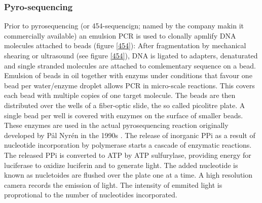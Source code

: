\subsubsection{Pyro-sequencing}
\label{sec:pyro-seq}



Prior to pyrosequencing (or 454-sequencign; named by the company makin
it commercially available) an emulsion PCR is used to clonally apmlify
DNA molecules attached to beads (figure \ref{454}): After
fragmentation by mechanical shearing or ultrasound \cite{pmid20298868}
(see figure \ref{454}), DNA is ligated to adapters, denaturated and
single stranded molecules are attached to comlementary sequence on a
bead. Emulsion of beads in oil together with enzyms under conditions
that favour one bead per water/enzyme droplet allows PCR in
micro-scale reactions. This covers each bead with multiple copies of
one target molecule. The beads are then distributed over the wells of
a fiber-optic slide, the so called picolitre plate. A single bead per
well is covered with enzymes on the surface of smaller beads. These
enzymes are used in the actual pyrosequencing reaction originally
developed by P\r{a}l Nyr\'{e}n in the 1990s \cite{pmid17185753}. The
release of inorganic PPi as a result of nucleotide incorporation by
polymerase starts a cascade of enzymatic reactions. The released PPi
is converted to ATP by ATP sulfurylase, providing energy for
luciferase to oxidize luciferin and to generate light. The added
nucleotide is known as nucletoides are flushed over the plate one at a
time. A high resolution camera records the emission of light. The
intensity of emmited light is proprotional to the number of
nucleotides incorporated.

